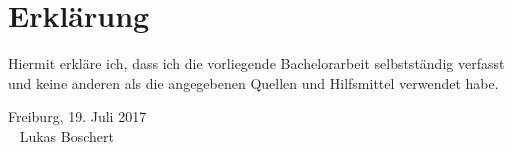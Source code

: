 \chapter*{Erkl\"arung}

Hiermit erkl\"are ich, dass ich die vorliegende Bachelorarbeit 
selbstst\"andig verfasst und keine anderen als die angegebenen
Quellen und Hilfsmittel verwendet habe. 

\bigskip
\bigskip

\noindent
Freiburg, 19. Juli 2017 \hfill \underline{\hspace{5cm}} \hspace*{.5cm} \\
\mbox{ } \hfill Lukas Boschert \hspace*{2cm}